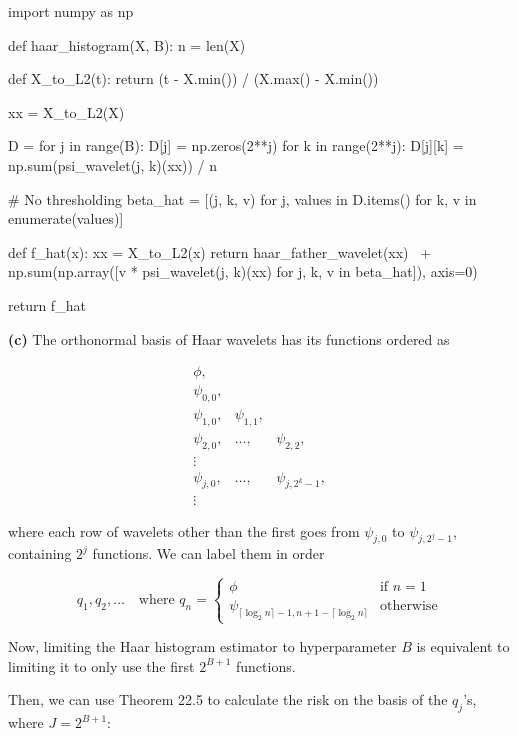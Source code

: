 \begin{python}
import numpy as np

def haar_histogram(X, B): 
    n = len(X)
    
    def X_to_L2(t):
        return (t - X.min()) / (X.max() - X.min())
    
    xx = X_to_L2(X)

    D = {}
    for j in range(B):
        D[j] = np.zeros(2**j)
        for k in range(2**j):
            D[j][k] = np.sum(psi_wavelet(j, k)(xx)) / n
            
    # No thresholding
    beta_hat = [(j, k, v) for j, values in D.items() for k, v in enumerate(values)]
    
    def f_hat(x):
        xx = X_to_L2(x)
        return haar_father_wavelet(xx) \
            + np.sum(np.array([v * psi_wavelet(j, k)(xx) for j, k, v in beta_hat]), axis=0)
    
    return f_hat
\end{python}


\textbf{(c)} The orthonormal basis of Haar wavelets has its functions
ordered as

\[ 
\begin{array}{ccc}
\phi, \\
\psi_{0, 0}, \\
\psi_{1, 0}, & \psi_{1, 1}, \\
\psi_{2, 0}, & \dots, & \psi_{2, 2}, \\
\vdots \\
\psi_{j, 0}, & \dots, & \psi_{j, 2^k - 1}, \\
\vdots
\end{array}
\]

where each row of wavelets other than the first goes from
\(\psi_{j, 0}\) to \(\psi_{j, 2^j - 1}\), containing \(2^j\) functions.
We can label them in order

\[ q_1, q_2, \dots 
\quad \text{where }q_n = \begin{cases}
\phi & \text{if }  n = 1 \\
\psi_{\lceil \log_2 n \rceil- 1, n + 1 - \lceil \log_2 n \rceil } & \text{otherwise}
\end{cases}\]

Now, limiting the Haar histogram estimator to hyperparameter \(B\) is
equivalent to limiting it to only use the first \(2^{B + 1}\) functions.

Then, we can use Theorem 22.5 to calculate the risk on the basis of the
\(q_j\)'s, where \(J = 2^{B + 1}\):

